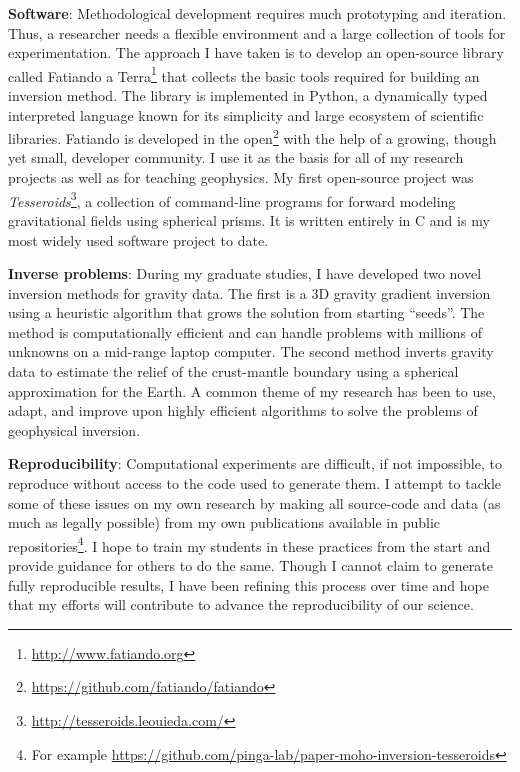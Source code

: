 \documentclass[12pt,notitlepage]{article}
\begin{document}
\textbf{Software}:
Methodological development requires
much prototyping and iteration.
%
Thus,
a researcher needs
a flexible environment
and a large collection of tools
for experimentation.
%
The approach I have taken is
to develop an open-source library
called Fatiando a Terra\footnote{\url{http://www.fatiando.org}}
that collects the basic tools
required for building an inversion method.
%
The library is implemented in Python,
a dynamically typed interpreted language
known for its simplicity
and large ecosystem of scientific libraries.
%
Fatiando is developed in the
open\footnote{\url{https://github.com/fatiando/fatiando}}
with the help of a growing, though yet small,
developer community.
%
I use it as the basis for
all of my research projects
as well as for teaching geophysics.
%
My first open-source project
was \textit{Tesseroids}\footnote{\url{http://tesseroids.leouieda.com/}},
a collection of command-line programs
for forward modeling gravitational fields
using spherical prisms.
%
It is written entirely in C
and is my most widely used software project to date.


\textbf{Inverse problems}:
During my graduate studies,
I have developed two novel inversion methods
for gravity data.
%
The first is a 3D gravity gradient inversion
using a heuristic algorithm
that grows the solution from starting ``seeds''.
%
The method is computationally efficient
and can handle problems with millions of unknowns
on a mid-range laptop computer.
%
The second method inverts gravity data
to estimate the relief
of the crust-mantle boundary
using a spherical approximation for the Earth.
%
A common theme of my research has been
to use, adapt, and improve upon
highly efficient algorithms
to solve the problems of geophysical inversion.


\textbf{Reproducibility}:
Computational experiments
are difficult, if not impossible, to reproduce
without access to the code used to generate them.
%
I attempt to tackle
some of these issues
on my own research
by making all source-code and data
(as much as legally possible)
from my own publications
available in public repositories\footnote{For example \url{https://github.com/pinga-lab/paper-moho-inversion-tesseroids}}.
%
I hope to train my students
in these practices from the start
and provide guidance for others to do the same.
%
Though I cannot claim
to generate fully reproducible results,
I have been refining this process over time
and hope that my efforts will contribute
to advance the reproducibility of our science.
\end{document}
